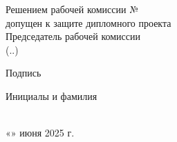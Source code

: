 \thispagestyle{empty}

\vspace*{19cm}

\begingroup
\singlespacing
    \noindent
    Решением рабочей комиссии № \underline{\hspace{0.5cm}} \\
    допущен к защите дипломного проекта \\
    Председатель рабочей комиссии \\
    \underline{\hspace{4cm}} (\underline{\hspace{0.5cm}}.\underline{\hspace{0.5cm}}.\underline{\hspace{3cm}}) \\[-5pt]
    \begin{minipage}{4cm}
        \fontsize{9pt}{10pt}\selectfont
        \centering
        Подпись
    \end{minipage}
    \hspace{0.3cm}
    \begin{minipage}{4cm}
        \fontsize{9pt}{10pt}\selectfont
        \centering
        Инициалы и фамилия
    \end{minipage} \\
    \vspace{1cm}
    «\underline{\hspace{0.8cm}}» июня 2025 г.
\endgroup
